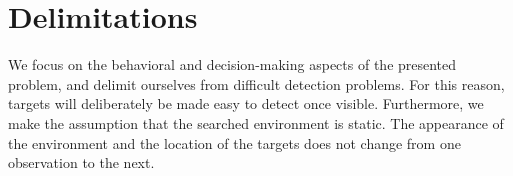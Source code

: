 \section{Delimitations}
\label{sec:delimitations}


We focus on the behavioral and decision-making aspects of the presented problem, and delimit ourselves from difficult detection problems.
For this reason, targets will deliberately be made easy to detect once visible.
Furthermore, we make the assumption that the searched environment is static.
The appearance of the environment and the location of the targets does not change from one observation to the next.
